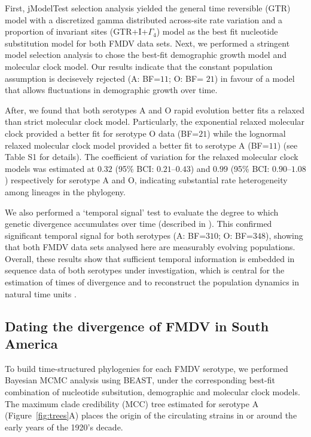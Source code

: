 \documentclass[10pt]{article}
\begin{document}
First, jModelTest selection analysis yielded the general time reversible (GTR) model with a discretized gamma distributed across-site rate variation and a proportion of invariant sites (GTR+I+$\Gamma_{4}$) model as the best fit nucleotide substitution model for both FMDV data sets.
Next, we performed a stringent model selection analysis to chose the best-fit demographic growth model and molecular clock model.
Our results indicate that the constant population assumption is decisevely rejected (A: BF=$11$; O: BF= $21$) in favour of a model that allows fluctuations in demographic growth over time. 

After, we found that both serotypes A and O rapid evolution better fits a relaxed than strict molecular clock model.
Particularly, the exponential relaxed molecular clock provided a better fit for serotype O data (BF=$21$) while the lognormal relaxed molecular clock model provided a better fit to serotype A (BF=$11$) (see Table S1 for details).
The coefficient of variation for the relaxed molecular clock models was estimated at $0.32$ (95\% BCI: $ 0.21$--$0.43$) and $0.99$ (95\% BCI: $0.90$--$1.08$) respectively for serotype A and O, indicating substantial rate heterogeneity among lineages in the phylogeny. 

We also performed a `temporal signal' test to evaluate the degree to which genetic divergence accumulates over time (described in \cite{Faria2012}).
This confirmed significant temporal signal for both serotypes (A: BF=$310$; O: BF=$348$), showing that both FMDV data sets analysed here are measurably evolving populations.
Overall, these results show that sufficient temporal information is embedded in sequence data of both serotypes under investigation, which is central for the estimation of times of divergence and to reconstruct the population dynamics in natural time units \cite{MEP}.

\subsection*{Dating the divergence of FMDV in South America}

To build time-structured phylogenies for each FMDV serotype, we performed Bayesian MCMC analysis using BEAST, under the corresponding best-fit combination of nucleotide subsitution, demographic and molecular clock models.
The maximum clade credibility (MCC) tree estimated for serotype A (Figure~\ref{fig:trees}A) places the origin of the circulating strains in or around the early years of the 1920's decade.
\end{document}
